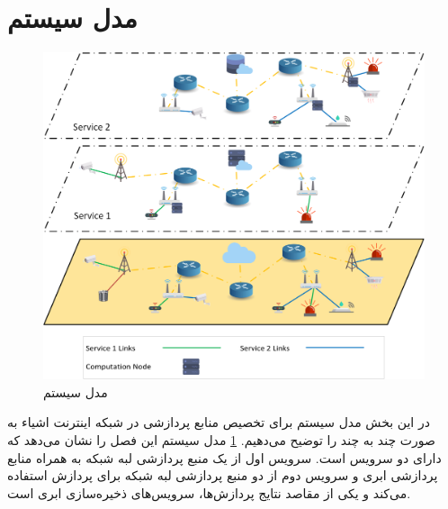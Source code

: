   \section{مدل سیستم}
    \begin{figure}[]
      \centerline{\includegraphics[width=15cm]{graphics/many_to_many/system_model}}
      \caption{مدل سیستم}
      \label{fig:many_to_many:system_model}
    \end{figure}
    در این بخش مدل سیستم برای تخصیص منابع پردازشی در شبکه اینترنت اشیاء به صورت چند به چند را توضیح می‌دهیم.
    \cref{fig:many_to_many:system_model} مدل سیستم این فصل را نشان می‌دهد که دارای دو سرویس است.
    سرویس اول از یک منبع پردازشی لبه شبکه به همراه منابع پردازشی ابری و سرویس دوم از دو منبع پردازشی لبه شبکه برای پردازش استفاده می‌کند و یکی از مقاصد نتایج پردازش‌ها، سرویس‌های ذخیره‌سازی ابری است.

